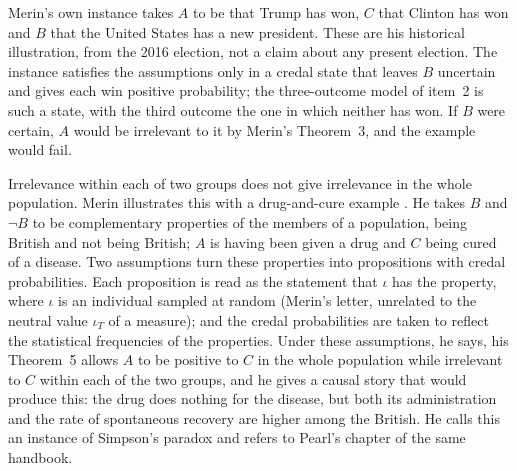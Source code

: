 Merin's own instance takes \(A\) to be that Trump has won, \(C\) that
Clinton has won and \(B\) that the United States has a new president.
These are his historical illustration, from the 2016 election, not a
claim about any present election. The instance satisfies the assumptions
only in a credal state that leaves \(B\) uncertain and gives each win
positive probability; the three-outcome model of item~2 is such a state,
with the third outcome the one in which neither has won. If \(B\) were
certain, \(A\) would be irrelevant to it by Merin's Theorem~3, and the
example would fail.

Irrelevance within each of two groups does not give irrelevance in the
whole population. Merin illustrates this with a drug-and-cure example
\cite[p.~267]{Merin2021Relevance}. He takes \(B\) and \(\neg B\) to be
complementary properties of the members of a population, being British
and not being British; \(A\) is having been given a drug and \(C\) being
cured of a disease. Two assumptions turn these properties into
propositions with credal probabilities. Each proposition is read as the
statement that \(\iota\) has the property, where \(\iota\) is an
individual sampled at random (Merin's letter, unrelated to the neutral
value \(\iota_T\) of a measure); and the credal probabilities are taken to
reflect the statistical frequencies of the properties. Under these
assumptions, he says, his Theorem~5 allows \(A\) to be positive to \(C\)
in the whole population while irrelevant to \(C\) within each of the
two groups, and he gives a causal story that would produce this: the
drug does nothing for the disease, but both its administration and the
rate of spontaneous recovery are higher among the British. He calls this
an instance of Simpson's paradox and refers to Pearl's chapter of the
same handbook.


